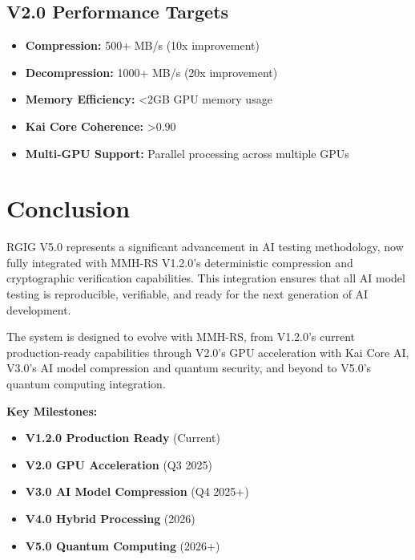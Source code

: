 \documentclass[11pt]{article}
\begin{document}
\subsection*{V2.0 Performance Targets}
\begin{itemize}
  \item \textbf{Compression:} 500+ MB/s (10x improvement)
  \item \textbf{Decompression:} 1000+ MB/s (20x improvement)
  \item \textbf{Memory Efficiency:} <2GB GPU memory usage
  \item \textbf{Kai Core Coherence:} >0.90
  \item \textbf{Multi-GPU Support:} Parallel processing across multiple GPUs
\end{itemize}

\section*{Conclusion}
RGIG V5.0 represents a significant advancement in AI testing methodology, now fully integrated with MMH-RS V1.2.0's deterministic compression and cryptographic verification capabilities. This integration ensures that all AI model testing is reproducible, verifiable, and ready for the next generation of AI development.

The system is designed to evolve with MMH-RS, from V1.2.0's current production-ready capabilities through V2.0's GPU acceleration with Kai Core AI, V3.0's AI model compression and quantum security, and beyond to V5.0's quantum computing integration.

\textbf{Key Milestones:}
\begin{itemize}
  \item \textbf{V1.2.0 Production Ready} (Current)
  \item \textbf{V2.0 GPU Acceleration} (Q3 2025)
  \item \textbf{V3.0 AI Model Compression} (Q4 2025+)
  \item \textbf{V4.0 Hybrid Processing} (2026)
  \item \textbf{V5.0 Quantum Computing} (2026+)
\end{itemize}
\end{document}
